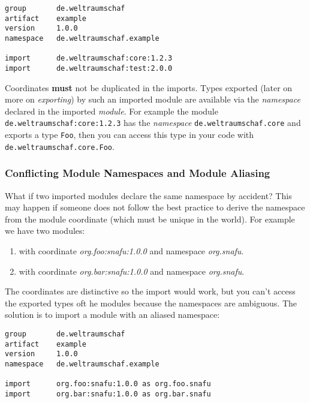 \documentclass[11pt,a4paper]{report}
\begin{document}
\begin{lstlisting}[language=CayThe, title=Module manifest with imports]
group       de.weltraumschaf
artifact    example
version     1.0.0
namespace   de.weltraumschaf.example

import      de.weltraumschaf:core:1.2.3
import      de.weltraumschaf:test:2.0.0
\end{lstlisting}

Coordinates \textbf{must} not be duplicated in the imports. Types exported (later on more on \textit{exporting}) by such an imported module are available via the \textit{namespace} declared in the imported \textit{module}. For example the module \texttt{de.weltraumschaf:core:1.2.3} has the \textit{namespace} \texttt{de.weltraumschaf.core} and exports a type \texttt{Foo}, then you can access this type in your code with \texttt{de.weltraumschaf.core.Foo}.

\subsubsection{Conflicting Module Namespaces and Module Aliasing}

What if two imported modules declare the same namespace by accident? This may happen if someone does not follow the best practice to derive the namespace from the module coordinate (which must be unique in the world). For example we have two modules:

\begin{enumerate}
    \item with coordinate \textit{org.foo:snafu:1.0.0} and namespace \textit{org.snafu}.
    \item with coordinate \textit{org.bar:snafu:1.0.0} and namespace \textit{org.snafu}.
\end{enumerate}

The coordinates are distinctive so the import would work, but you can't access the exported types oft he modules because the namespaces are ambiguous. The solution is to import a module with an aliased namespace:

\begin{lstlisting}[language=CayThe, title=Module manifest aliased namespaces]
group       de.weltraumschaf
artifact    example
version     1.0.0
namespace   de.weltraumschaf.example

import      org.foo:snafu:1.0.0 as org.foo.snafu
import      org.bar:snafu:1.0.0 as org.bar.snafu
\end{lstlisting}
\end{document}

